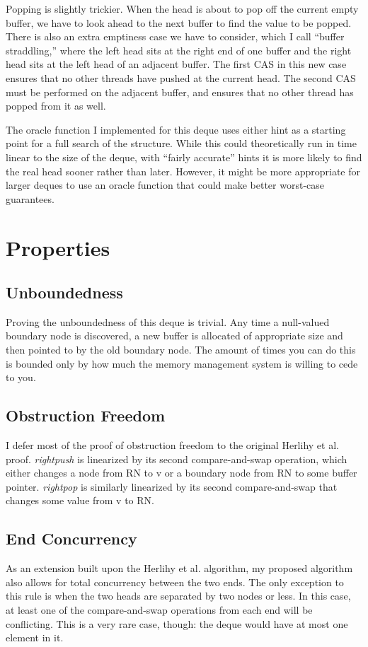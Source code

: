 \documentclass[11pt, letterpaper]{article}
\begin{document}
            Popping is slightly trickier. When the head is about to pop off the current empty buffer, we have to look ahead to the next buffer to find the value to be popped. There is also an extra emptiness case we have to consider, which I call ``buffer straddling,'' where the left head sits at the right end of one buffer and the right head sits at the left head of an adjacent buffer. The first CAS in this new case ensures that no other threads have pushed at the current head. The second CAS must be performed on the adjacent buffer, and ensures that no other thread has popped from it as well.

            The oracle function I implemented for this deque uses either hint as a starting point for a full search of the structure. While this could theoretically run in time linear to the size of the deque, with ``fairly accurate'' hints it is more likely to find the real head sooner rather than later. However, it might be more appropriate for larger deques to use an oracle function that could make better worst-case guarantees.

    \section{Properties}        
        \subsection{Unboundedness}
            Proving the unboundedness of this deque is trivial. Any time a null-valued boundary node is discovered, a new buffer is allocated of appropriate size and then pointed to by the old boundary node. The amount of times you can do this is bounded only by how much the memory management system is willing to cede to you.

        \subsection{Obstruction Freedom}
            I defer most of the proof of obstruction freedom to the original Herlihy et al. proof. \emph{rightpush} is linearized by its second compare-and-swap operation, which either changes a node from RN to v or a boundary node from RN to some buffer pointer. \emph{rightpop} is similarly linearized by its second compare-and-swap that changes some value from v to RN.

        \subsection{End Concurrency}
            As an extension built upon the Herlihy et al. algorithm, my proposed algorithm also allows for total concurrency between the two ends. The only exception to this rule is when the two heads are separated by two nodes or less. In this case, at least one of the compare-and-swap operations from each end will be conflicting. This is a very rare case, though: the deque would have at most one element in it.
\end{document}
